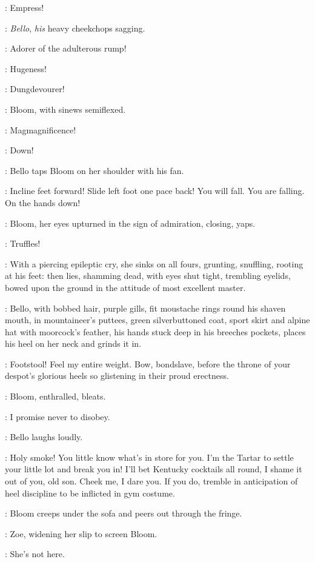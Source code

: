 \Bloom:
Empress!

:
\emph{Bello}, \emph{his} heavy cheekchops sagging.

\Bello:
Adorer of the adulterous rump!

\Bloom:
Hugeness!

\Bello:
Dungdevourer!

:
Bloom, with sinews semiflexed.

\Bloom:
Magmagnificence!

\Bello:
Down!

:
Bello taps Bloom on her shoulder with his fan.

\Bello:
Incline feet forward!
Slide left foot one pace back!
You will fall.
You are falling.
On the hands down!

:
Bloom, her eyes upturned in the sign of admiration, closing, yaps.

\Bloom:
Truffles!

:
With a piercing epileptic cry, she sinks on all fours,
grunting, snuffling, rooting at his feet:
then lies, shamming dead, with eyes shut tight, trembling eyelids,
bowed upon the ground in the attitude of most excellent master.

:
Bello, with bobbed hair, purple gills, fit moustache rings round his shaven mouth,
in mountaineer's puttees, green silverbuttoned coat,
sport skirt and alpine hat with moorcock's feather,
his hands stuck deep in his breeches pockets,
places his heel on her neck and grinds it in.

\Bello:
Footstool!
Feel my entire weight.
Bow, bondslave, before the throne of your despot's glorious heels
so glistening in their proud erectness.

:
Bloom, enthralled, bleats.

\Bloom:
I promise never to disobey.

:
Bello laughs loudly.

\Bello:
Holy smoke!
You little know what's in store for you.
I'm the Tartar to settle your little lot and break you in!
I'll bet Kentucky cocktails all round, I shame it out of you, old son.
Cheek me, I dare you.
If you do, tremble in anticipation of heel discipline
to be inflicted in gym costume.%

:
Bloom creeps under the sofa and peers out through the fringe.

:
Zoe, widening her slip to screen Bloom.

\Zoe:
She's not here.

